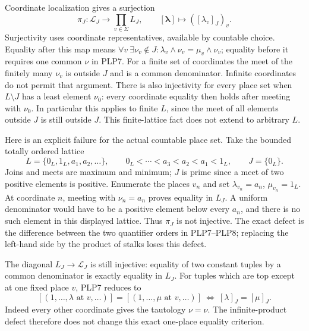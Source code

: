 Coordinate localization gives a surjection
\begin{equation}\tag{PLP8}
\pi_J:\mathscr L_J\longrightarrow\prod_{v\in\Sigma}L_J,\qquad
[\boldsymbol\lambda]\longmapsto([\lambda_v]_J)_v.
\end{equation}
Surjectivity uses coordinate representatives, available by countable
choice. Equality after this map means
$\forall v\ \exists\nu_v\notin J:
\lambda_v\wedge\nu_v=\mu_v\wedge\nu_v$; equality before it requires
one common $\nu$ in PLP7. For a finite set of coordinates the meet
of the finitely many $\nu_v$ is outside $J$ and is a common
denominator. Infinite coordinates do not permit that argument.
There is also injectivity for every place set when $L\setminus J$
has a least element $\nu_0$: every coordinate equality then holds
after meeting with $\nu_0$. In particular this applies to finite
$L$, since the meet of all elements outside $J$ is still outside
$J$. This finite-lattice fact does not extend to arbitrary $L$.

Here is an explicit failure for the actual countable place set.
Take the bounded totally ordered lattice
\begin{equation}\tag{PLP9}
L=\{0_L,1_L,a_1,a_2,\ldots\},
\qquad 0_L<\cdots<a_3<a_2<a_1<1_L,\qquad J=\{0_L\}.
\end{equation}
Joins and meets are maximum and minimum; $J$ is prime since a meet
of two positive elements is positive. Enumerate the places $v_n$ and
set $\lambda_{v_n}=a_n$, $\mu_{v_n}=1_L$. At coordinate $n$, meeting
with $\nu_n=a_n$ proves equality in $L_J$. A uniform denominator
would have to be a positive element below every $a_n$, and there is
no such element in this displayed lattice. Thus $\pi_J$ is not
injective. The exact defect is the difference between the two
quantifier orders in PLP7--PLP8; replacing the left-hand side by
the product of stalks loses this defect.

The diagonal $L_J\to\mathscr L_J$ is still injective: equality of
two constant tuples by a common denominator is exactly equality
in $L_J$. For tuples which are top except at one fixed place $v$,
PLP7 reduces to
\begin{equation}\tag{PLP10}
[(1,\ldots,\lambda\text{ at }v,\ldots)]
=[(1,\ldots,\mu\text{ at }v,\ldots)]
\ \Longleftrightarrow\ [\lambda]_J=[\mu]_J.
\end{equation}
Indeed every other coordinate gives the tautology $\nu=\nu$.
The infinite-product defect therefore does not change this exact
one-place equality criterion.

